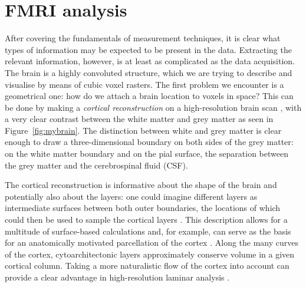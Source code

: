 \section*{FMRI analysis}
After covering the fundamentals of measurement techniques, it is clear what types of information may be expected to be present in the data. Extracting the relevant information, however, is at least as complicated as the data acquisition. The brain is a highly convoluted structure, which we are trying to describe and visualise by means of cubic voxel rasters. The first problem we encounter is a geometrical one: how do we attach a brain location to voxels in space? This can be done by making a \emph{cortical reconstruction} on a high-resolution brain scan \cite{Dale1999,Bazin2012}, with a very clear contrast between the white matter and grey matter as seen in Figure~\ref{fig:mybrain}. The distinction between white and grey matter is clear enough to draw a three-dimensional boundary on both sides of the grey matter: on the white matter boundary and on the pial surface, the separation between the grey matter and the cerebrospinal fluid (CSF).

The cortical reconstruction is informative about the shape of the brain and potentially also about the layers: one could imagine different layers as intermediate surfaces between both outer boundaries, the locations of which could then be used to sample the cortical layers \cite{Koopmans2011,Polimeni2010,DeMartino2013}. This description allows for a multitude of surface-based calculations \cite{Fischl2000,Bazin2012} and, for example, can serve as the basis for an anatomically motivated parcellation of the cortex  \cite{Bok1929,Waehnert2014}. Along the many curves of the cortex, cytoarchitectonic layers approximately conserve volume in a given cortical column. Taking a more naturalistic flow of the cortex into account can provide a clear advantage in high-resolution laminar analysis \cite{Waehnert2014}.

